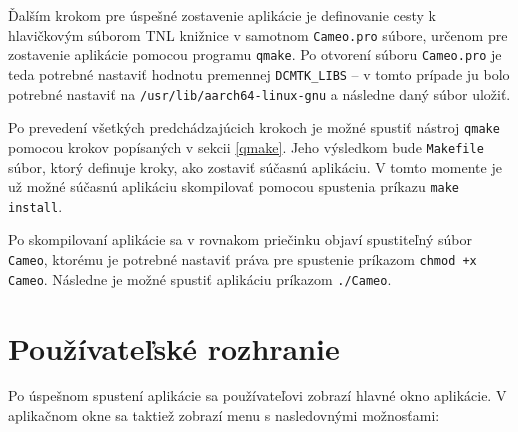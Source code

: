 {Ďalším krokom pre úspešné zostavenie aplikácie je definovanie cesty k hlavičkovým súborom TNL knižnice v samotnom \texttt{Cameo.pro} súbore, určenom pre zostavenie aplikácie pomocou programu \texttt{qmake}. Po otvorení súboru \texttt{Cameo.pro} je teda potrebné nastaviť hodnotu premennej \lstinline{DCMTK_LIBS} -- v tomto prípade ju bolo potrebné nastaviť na \texttt{/usr/lib/aarch64-linux-gnu} a následne daný súbor uložiť.

Po prevedení všetkých predchádzajúcich krokoch je možné spustiť nástroj \texttt{qmake} pomocou krokov popísaných v sekcii \ref{qmake}. Jeho výsledkom bude \texttt{Makefile} súbor, ktorý definuje kroky, ako zostaviť súčasnú aplikáciu. V tomto momente je už možné súčasnú aplikáciu skompilovať pomocou spustenia príkazu \texttt{make install}.

Po skompilovaní aplikácie sa v rovnakom priečinku objaví spustiteľný súbor \texttt{Cameo}, ktorému je potrebné nastaviť práva pre spustenie príkazom \texttt{chmod +x Cameo}. Následne je možné spustiť aplikáciu príkazom \texttt{./Cameo}. \clearpage

\section {Používateľské rozhranie}\label{old_ui}
Po úspešnom spustení aplikácie sa používateľovi zobrazí hlavné okno aplikácie.
V aplikačnom okne sa taktiež zobrazí menu s nasledovnými možnosťami:

}
